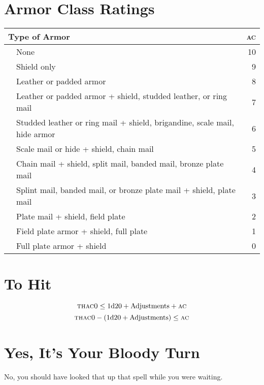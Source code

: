 \documentclass[10pt,letterpaper]{article}
\newcommand{\AC}[0]{{\scshape ac}}
\newcommand{\THACO}[0]{{\scshape thac0}}
\begin{document}
\hfill
\begin{minipage}[t]{0.330\textwidth}
  \section*{Armor Class Ratings}
  \begin{tabularx}{\textwidth}{lXr}
    \toprule
    \multicolumn{2}{l}{Type of Armor} & \AC \\
    \midrule
    &\hspace{-1.2em}None & 10 \\
    &\hspace{-1.2em}Shield only & 9 \\
    &\hspace{-1.2em}Leather or padded armor & 8 \\
    &\hspace{-1.2em}Leather or padded armor + shield, studded leather, or ring mail & 7 \\
    &\hspace{-1.2em}Studded leather or ring mail + shield, brigandine, scale mail, hide armor & 6 \\
    &\hspace{-1.2em}Scale mail or hide + shield, chain mail & 5 \\
    &\hspace{-1.2em}Chain mail + shield, split mail, banded mail, bronze plate mail & 4 \\
    &\hspace{-1.2em}Splint mail, banded mail, or bronze plate mail + shield, plate mail & 3 \\
    &\hspace{-1.2em}Plate mail + shield, field plate & 2 \\
    &\hspace{-1.2em}Field plate armor + shield, full plate & 1 \\
    &\hspace{-1.2em}Full plate armor + shield & 0 \\
    \bottomrule
  \end{tabularx}

  \normalsize
  \section*{To Hit}
  $$\text{\THACO} \le \text{1d20} + \text{Adjustments} + \text{\AC}$$
  $$\text{\THACO} - \left(\text{1d20} + \text{Adjustments}\right) \le \text{\AC}$$

  \section*{\centering Yes, It's Your Bloody Turn}
  No, you should have looked that up that spell while you were waiting.
\end{minipage}
\end{document}
